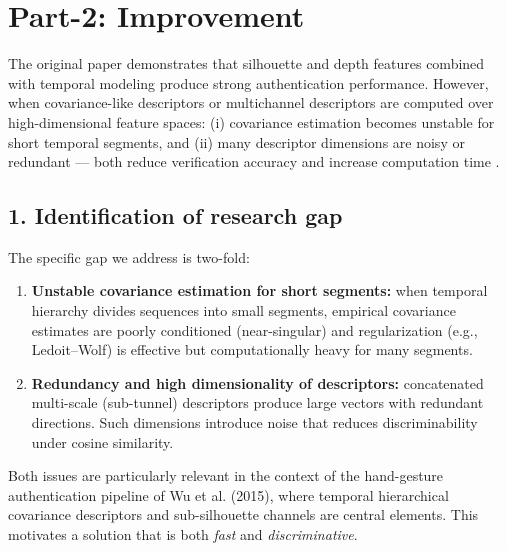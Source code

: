 

\section*{Part-2: Improvement}
\label{sec:part2_improvement}
The original paper demonstrates that silhouette and depth features combined with temporal modeling produce strong authentication performance. However, when covariance-like descriptors or multichannel descriptors are computed over high-dimensional feature spaces: (i) covariance estimation becomes unstable for short temporal segments, and (ii) many descriptor dimensions are noisy or redundant — both reduce verification accuracy and increase computation time \cite{Wu2015}. 

\subsection*{1. Identification of research gap }
\label{sec:gap}
The specific gap we address is two-fold:
\begin{enumerate}
  \item \textbf{Unstable covariance estimation for short segments:} when temporal hierarchy divides sequences into small segments, empirical covariance estimates are poorly conditioned (near-singular) and regularization (e.g., Ledoit–Wolf) is effective but computationally heavy for many segments.
  \item \textbf{Redundancy and high dimensionality of descriptors:} concatenated multi-scale (sub-tunnel) descriptors produce large vectors with redundant directions. Such dimensions introduce noise that reduces discriminability under cosine similarity.
\end{enumerate}
Both issues are particularly relevant in the context of the hand-gesture authentication pipeline of Wu et al. (2015), where temporal hierarchical covariance descriptors and sub-silhouette channels are central elements. This motivates a solution that is both \emph{fast} and \emph{discriminative}.

